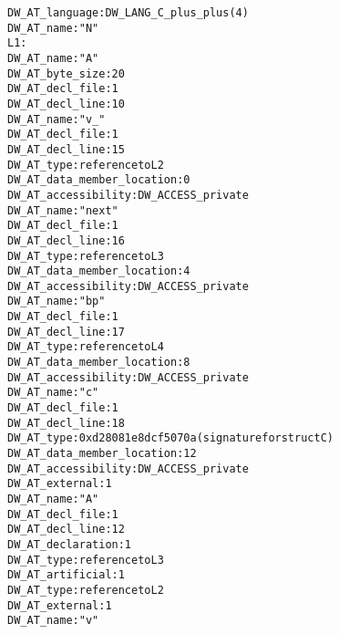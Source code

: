 \begin{alltt}
      DW\-\_AT\-\_language: DW\-\_LANG\-\_C\-\_plus\-\_plus (4)
          DW\-\_AT\-\_name: "N"
L1:
             DW\-\_AT\-\_name: "A"
             DW\-\_AT\-\_byte\-\_size: 20
             DW\-\_AT\-\_decl\-\_file: 1
             DW\-\_AT\-\_decl\-\_line: 10
                DW\-\_AT\-\_name: "v\_"
                DW\-\_AT\-\_decl\-\_file: 1
                DW\-\_AT\-\_decl\-\_line: 15
                DW\-\_AT\-\_type: reference to L2
                DW\-\_AT\-\_data\-\_member\-\_location: 0
                DW\-\_AT\-\_accessibility: DW\-\_ACCESS\-\_private
               DW\-\_AT\-\_name: "next"
               DW\-\_AT\-\_decl\-\_file: 1
               DW\-\_AT\-\_decl\-\_line: 16
               DW\-\_AT\-\_type: reference to L3
               DW\-\_AT\-\_data\-\_member\-\_location: 4
               DW\-\_AT\-\_accessibility: DW\-\_ACCESS\-\_private
               DW\-\_AT\-\_name: "bp"
               DW\-\_AT\-\_decl\-\_file: 1
               DW\-\_AT\-\_decl\-\_line: 17
               DW\-\_AT\-\_type: reference to L4
               DW\-\_AT\-\_data\-\_member\-\_location: 8
               DW\-\_AT\-\_accessibility: DW\-\_ACCESS\-\_private
               DW\-\_AT\-\_name: "c"
               DW\-\_AT\-\_decl\-\_file: 1
               DW\-\_AT\-\_decl\-\_line: 18
               DW\-\_AT\-\_type: 0xd28081e8 dcf5070a (signature for struct C)
               DW\-\_AT\-\_data\-\_member\-\_location: 12
               DW\-\_AT\-\_accessibility: DW\-\_ACCESS\-\_private
           DW\-\_AT\-\_external: 1
           DW\-\_AT\-\_name: "A"
           DW\-\_AT\-\_decl\-\_file: 1
           DW\-\_AT\-\_decl\-\_line: 12
           DW\-\_AT\-\_declaration: 1
           DW\-\_AT\-\_type: reference to L3
           DW\-\_AT\-\_artificial: 1
           DW\-\_AT\-\_type: reference to L2
           DW\-\_AT\-\_external: 1
           DW\-\_AT\-\_name: "v"

\end{alltt}
